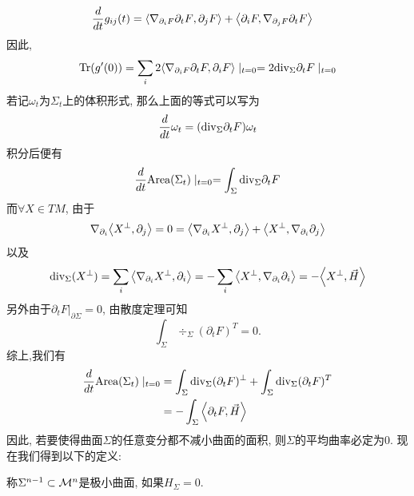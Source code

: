 \begin{equation}
    \begin{split}
        \frac{d}{dt} g_{ij}(t) & ={\left < \nabla_{\partial_i F}{\partial_tF}, \partial_jF \right >}+ {\left < \partial_iF, \nabla_{\partial_jF}\partial_tF \right >}
    \end{split}
\end{equation}
因此,
\begin{equation}
    \text{Tr}(g'(0))=\sum_i 2{\left < \nabla_{\partial_iF}\partial_tF, \partial_iF \right >} \mid_{t=0}=2{\text{div}}_\Sigma \partial_tF\mid_{t=0}
\end{equation}
若记$\omega_t$为$\Sigma_t$上的体积形式, 那么上面的等式可以写为
\begin{equation}
    \frac{d}{dt} \omega_t =({\text{div}}_\Sigma \partial_t F)\omega_t
\end{equation}
积分后便有
\begin{equation}
    \frac{d}{dt} \text{Area}(\Sigma_t)\mid_{t=0}=\int_\Sigma {\text{div}}_\Sigma \partial_t F
\end{equation}
而$\forall X \in TM$, 由于
\begin{equation}
    \nabla_{\partial_i}{\left < X^\perp, \partial_j \right >}=0={\left < \nabla_{\partial_i}X^\perp, \partial_j \right >}+{\left < X^\perp, \nabla_{\partial_i}\partial_j \right >}
\end{equation}
以及 
\begin{equation}
    {\text{div}}_\Sigma(X^\perp)=\sum_i{\left < \nabla_{\partial_i}X^\perp, \partial_i \right >}=-\sum_i{\left < X^\perp, \nabla_{\partial_i}\partial_i \right >}=-{\left < X^\perp, \vec{H} \right >}
\end{equation}
另外由于$\partial_tF|_{\partial \Sigma}=0$, 由散度定理可知
\begin{equation}
        \int_\Sigma \div_{\Sigma}(\partial_tF)^T =0.
\end{equation}
综上,我们有
\begin{equation}
    \begin{split}
        \frac{d}{dt} \text{Area}(\Sigma_t)\mid_{t=0} & = \int_\Sigma {\text{div}}_{\Sigma}(\partial_tF)^\perp + \int_\Sigma {\text{div}}_{\Sigma}(\partial_tF)^T \\
        &=-\int_\Sigma{\left < \partial_tF, \vec{H} \right >}
    \end{split}
\end{equation}
因此, 若要使得曲面$\Sigma$的任意变分都不减小曲面的面积, 则$\Sigma$的平均曲率必定为0. 现在我们得到以下的定义:
\begin{definition}
    称$\Sigma^{n-1} \subset {\mathcal{M}}^n$是极小曲面, 如果$H_\Sigma=0$.
\end{definition}
